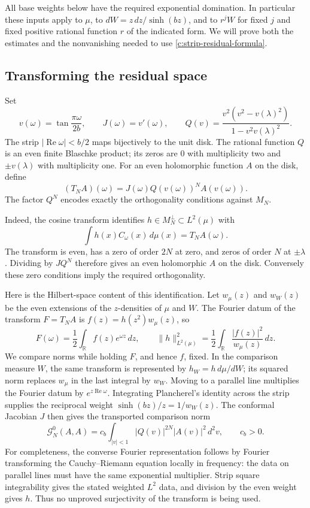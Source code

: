 \documentclass[11pt]{article}
\numberwithin{equation}{section}
\theoremstyle{definition}\newtheorem{definition}[theorem]{Definition}
\theoremstyle{remark}\newtheorem{remark}[theorem]{Remark}
\begin{document}
All base weights below have the required exponential domination.  In
particular these inputs apply to $\mu$, to
$dW=z\,dz/\sinh(bz)$, and to $r^jW$ for fixed $j$ and fixed positive
rational function $r$ of the indicated form.  We will prove both the estimates and the nonvanishing
needed to use \eqref{c:strip-residual-formula}.

\subsection{Transforming the residual space}

Set
\[
 v(\omega)=\tan\frac{\pi\omega}{2b},\qquad
 J(\omega)=v'(\omega),\qquad
 Q(v)=\frac{v^2(v^2-v(\lambda)^2)}{1-v^2v(\lambda)^2}.
\]
The strip $|\operatorname{Re}\omega|<b/2$ maps bijectively to the unit
disk.  The rational function $Q$ is an even finite Blaschke product;
its zeros are $0$ with multiplicity two and $\pm v(\lambda)$ with
multiplicity one.  For an even holomorphic function $A$ on the disk,
define
\[
 (T_NA)(\omega)=J(\omega)Q(v(\omega))^N A(v(\omega)).
\]
The factor $Q^N$ encodes exactly the orthogonality conditions against
$M_N$.

Indeed, the cosine transform identifies $h\in M_N^\perp\subset
L^2(\mu)$ with
\begin{equation}\label{c:residual-transform}
 \int h(x)C_\omega(x)\,d\mu(x)=T_NA(\omega).
\end{equation}
The transform is even, has a zero of order $2N$ at zero, and zeros of
order $N$ at $\pm\lambda$.  Dividing by $JQ^N$ therefore gives an
even holomorphic $A$ on the disk.  Conversely these zero conditions
imply the required orthogonality.

Here is the Hilbert-space content of this identification.  Let
$w_\mu(z)$ and $w_W(z)$ be the even extensions of the $z$-densities of
$\mu$ and $W$.  The Fourier datum of the transform $F=T_NA$ is
$f(z)=h(z^2)w_\mu(z)$, so
\[
 F(\omega)=\frac12\int_{\mathbb R}f(z)e^{\omega z}\,dz,
 \qquad
 \|h\|_{L^2(\mu)}^2
 =\frac12\int_{\mathbb R}\frac{|f(z)|^2}{w_\mu(z)}\,dz.
\]
We compare norms while holding $F$, and hence $f$, fixed.  In the
comparison measure $W$, the same transform is represented by
$h_W=h\,d\mu/dW$; its squared norm replaces $w_\mu$ in the last
integral by $w_W$.  Moving to a parallel line multiplies the Fourier
datum by $e^{z\operatorname{Re}\omega}$.  Integrating Plancherel's
identity across the strip supplies the reciprocal weight
$\sinh(bz)/z=1/w_W(z)$.  The conformal Jacobian $J$ then gives the
transported comparison norm
\begin{equation}\label{c:model-norm}
 \mathcal G_N^0(A,A)
 =c_b\int_{|v|<1}|Q(v)|^{2N}|A(v)|^2\,d^2v,
 \qquad c_b>0.
\end{equation}
For completeness, the converse Fourier representation follows by
Fourier transforming the Cauchy--Riemann equation locally in frequency:
the data on parallel lines must have the same exponential multiplier.
Strip square integrability gives the stated weighted $L^2$ data, and
division by the even weight gives $h$.  Thus no unproved surjectivity
of the transform is being used.
\end{document}
